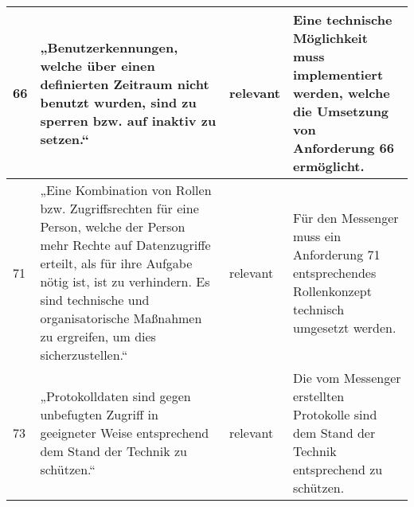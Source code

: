 \begin{longtable}{p{0.6cm}|p{6cm}|p{2cm}|p{6cm}}
    66     & „Benutzerkennungen, welche über einen definierten Zeitraum nicht benutzt wurden, sind zu sperren bzw. auf inaktiv zu setzen.“                                                                                                                                                                        & relevant           & Eine technische Möglichkeit muss implementiert werden, welche die Umsetzung von Anforderung 66 ermöglicht.                                                                                                                                                                                                                                                                                                                                                                                                                                                          \\ \hline
    71     & „Eine Kombination von Rollen bzw. Zugriffsrechten für eine Person, welche der Person mehr Rechte auf Datenzugriffe erteilt, als für ihre Aufgabe nötig ist, ist zu verhindern. Es sind technische und organisatorische Maßnahmen zu ergreifen, um dies sicherzustellen.“                             & relevant           & Für den Messenger muss ein Anforderung 71 entsprechendes Rollenkonzept technisch umgesetzt werden.                                                                                                                                                                                                                                                                                                                                                                                                                                                                  \\ \hline
    73     & „Protokolldaten sind gegen unbefugten Zugriff in geeigneter Weise entsprechend dem Stand der Technik zu schützen.“                                                                                                                                                                                   & relevant           & Die vom Messenger erstellten Protokolle sind dem Stand der Technik entsprechend zu schützen.                                                                                                                                                                                                                                                                                                                                                                                                                                                                    \\ \hline

\end{longtable}
